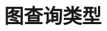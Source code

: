 \documentclass{XDBAthesis}
\begin{document}
\section{图查询类型}









\ifx\allfiles\undefined


\end{document}
